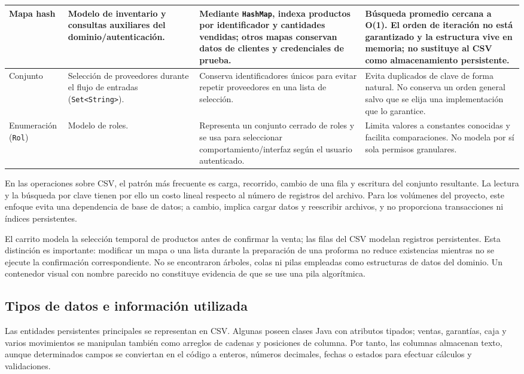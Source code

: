 \begin{longtable}{|p{2.6cm}|p{3.3cm}|p{3.4cm}|p{3.3cm}|}
\hline
Mapa hash & Modelo de inventario y consultas auxiliares del dominio/autenticación. & Mediante \texttt{HashMap}, indexa productos por identificador y cantidades vendidas; otros mapas conservan datos de clientes y credenciales de prueba. & Búsqueda promedio cercana a O(1). El orden de iteración no está garantizado y la estructura vive en memoria; no sustituye al CSV como almacenamiento persistente.\\
\hline
Conjunto & Selección de proveedores durante el flujo de entradas (\texttt{Set<String>}). & Conserva identificadores únicos para evitar repetir proveedores en una lista de selección. & Evita duplicados de clave de forma natural. No conserva un orden general salvo que se elija una implementación que lo garantice.\\
\hline
Enumeración (\texttt{Rol}) & Modelo de roles. & Representa un conjunto cerrado de roles y se usa para seleccionar comportamiento/interfaz según el usuario autenticado. & Limita valores a constantes conocidas y facilita comparaciones. No modela por sí sola permisos granulares.\\
\hline
\end{longtable}

En las operaciones sobre CSV, el patrón más frecuente es carga, recorrido, cambio de una fila y escritura del conjunto resultante. La lectura y la búsqueda por clave tienen por ello un costo lineal respecto al número de registros del archivo. Para los volúmenes del proyecto, este enfoque evita una dependencia de base de datos; a cambio, implica cargar datos y reescribir archivos, y no proporciona transacciones ni índices persistentes.

El carrito modela la selección temporal de productos antes de confirmar la venta; las filas del CSV modelan registros persistentes. Esta distinción es importante: modificar un mapa o una lista durante la preparación de una proforma no reduce existencias mientras no se ejecute la confirmación correspondiente. No se encontraron árboles, colas ni pilas empleadas como estructuras de datos del dominio. Un contenedor visual con nombre parecido no constituye evidencia de que se use una pila algorítmica.

\subsection{Tipos de datos e información utilizada}
\label{subsec:datos}

Las entidades persistentes principales se representan en CSV. Algunas poseen clases Java con atributos tipados; ventas, garantías, caja y varios movimientos se manipulan también como arreglos de cadenas y posiciones de columna. Por tanto, las columnas almacenan texto, aunque determinados campos se conviertan en el código a enteros, números decimales, fechas o estados para efectuar cálculos y validaciones.

